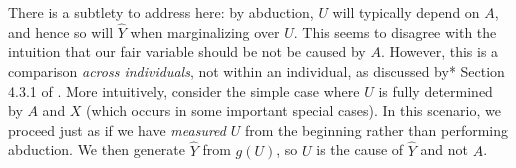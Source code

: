 
There is a subtlety to address here: by abduction,
$U$ will typically depend on $A$, and hence so will $\hat Y$ when
marginalizing over $U$.
This seems to disagree with the intuition that our fair
variable should be not be caused by $A$. However, this is a comparison
{\it across individuals}, not within an individual, as discussed by*
Section 4.3.1 of \citep{pearl:16}. More intuitively, consider the
simple case where $U$ is fully determined by $A$ and $X$ (which occurs
in some important special cases).
In this
scenario, we proceed just as if we have {\it measured} $U$ from the
beginning rather than performing abduction.
We then generate $\hat Y$ from $g(U)$, so $U$ is the cause of
$\hat Y$ and not $A$. 



